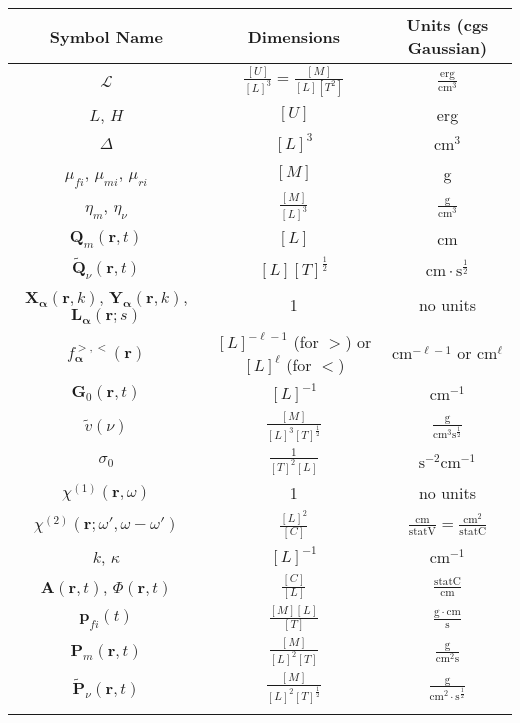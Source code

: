\documentclass{article}
\begin{document}
\begin{center}
\def\arraystretch{1.5}
\begin{longtable}{c|c|c}
    Symbol Name & Dimensions & Units (cgs Gaussian) \\
    \hline
    $\mathcal{L}$ & $\frac{[U]}{[L]^3} = \frac{[M]}{[L][T^2]}$ & $\frac{\mathrm{erg}}{\mathrm{cm}^3}$\\
    $L$, $H$ & $[U]$ & erg\\
    $\Delta$ & $[L]^3$ & cm$^3$\\
    $\mu_{fi}$, $\mu_{mi}$, $\mu_{ri}$ & $[M]$ & g\\
    $\eta_m$, $\eta_\nu$ & $\frac{[M]}{[L]^3}$ & $\frac{\mathrm{g}}{\mathrm{cm}^3}$\\
    $\mathbf{Q}_m(\mathbf{r},t)$ & $[L]$ & cm\\
    $\tilde{\mathbf{Q}}_\nu(\mathbf{r},t)$ & $[L][T]^\frac{1}{2}$ & $\mathrm{cm}\cdot \mathrm{s}^\frac{1}{2}$\\
    $\mathbf{X}_{\bm{\alpha}}(\mathbf{r},k)$, $\mathbf{Y}_{\bm{\alpha}}(\mathbf{r},k)$, $\mathbf{L}_{\bm{\alpha}}(\mathbf{r};s)$ & 1 & no units\\
    $f_{\bm{\alpha}}^{>,<}(\mathbf{r})$ & $[L]^{-\ell-1}$ (for $>$) or $[L]^{\ell}$ (for $<$) & $\mathrm{cm}^{-\ell-1}$ or $\mathrm{cm}^\ell$\\
    $\mathbf{G}_0(\mathbf{r},t)$ & $[L]^{-1}$ & cm$^{-1}$\\
    $\tilde{v}(\nu)$ & $\frac{[M]}{[L]^3[T]^\frac{1}{2}}$ & $\frac{\mathrm{g}}{\mathrm{cm}^3\mathrm{s}^\frac{1}{2}}$\\
    $\sigma_0$ & $\frac{1}{[T]^2[L]}$ & $\mathrm{s}^{-2}$$\mathrm{cm}^{-1}$\\
    $\chi^{(1)}(\mathbf{r},\omega)$ & 1 & no units\\
    $\chi^{(2)}(\mathbf{r};\omega',\omega - \omega')$ & $\frac{[L]^2}{[C]}$ & $\frac{\mathrm{cm}}{\mathrm{statV}} = \frac{\mathrm{cm}^2}{\mathrm{statC}}$\\
    $k$, $\kappa$ & $[L]^{-1}$ & cm$^{-1}$\\
    $\mathbf{A}(\mathbf{r},t)$, $\Phi(\mathbf{r},t)$ & $\frac{[C]}{[L]}$ & $\frac{\mathrm{statC}}{\mathrm{cm}}$\\
    $\mathbf{p}_{fi}(t)$ & $\frac{[M][L]}{[T]}$ & $\frac{\mathrm{g}\cdot\mathrm{cm}}{\mathrm{s}}$\\
    $\mathbf{P}_m(\mathbf{r},t)$ & $\frac{[M]}{[L]^2[T]}$ & $\frac{\mathrm{g}}{\mathrm{cm}^2\mathrm{s}}$\\
    $\tilde{\mathbf{P}}_\nu(\mathbf{r},t)$ & $\frac{[M]}{[L]^2[T]^\frac{1}{2}}$ & $\frac{\mathrm{g}}{\mathrm{cm}^2\cdot\mathrm{s}^\frac{1}{2}}$\\
$$
\end{longtable}
\end{center}
\end{document}
